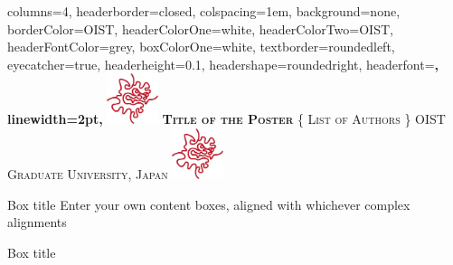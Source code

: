 \documentclass[
    a0paper, %
    landscape, %
    fontscale=0.3 %
    ]{baposter}
\begin{document}
\begin{poster}{ %
    columns=4, %
    headerborder=closed, %
    colspacing=1em, %
    background=none, %
    borderColor=OIST, %
    headerColorOne=white, %
    headerColorTwo=OIST, %
    headerFontColor=grey, %
    boxColorOne=white, %
    textborder=roundedleft, %
    eyecatcher=true, %
    headerheight=0.1\textheight, %
    headershape=roundedright, %
    headerfont=\Large\bf\textsc, %
    linewidth=2pt, %
} 
{\includegraphics[height=4em]{logo.jpg}} %
{\bf\textsc{Title of the Poster}\vspace{0.5em}} %
{\textsc{\{ List of Authors \} \hspace{12pt} OIST Graduate University, Japan}} %
{\includegraphics[height=4em]{logo.jpg}} %



\begin{posterbox}[
    name = box1,  %
    column = 0, %
    ]{Box title}
    Enter your own content boxes, aligned with whichever complex alignments
\end{posterbox}


\begin{posterbox}[
    name = box2,  %
    column = 0, %
    below = box1, %
    ]{Box title}
    \lipsum[1]
\end{posterbox}



\end{poster}
\end{document}
